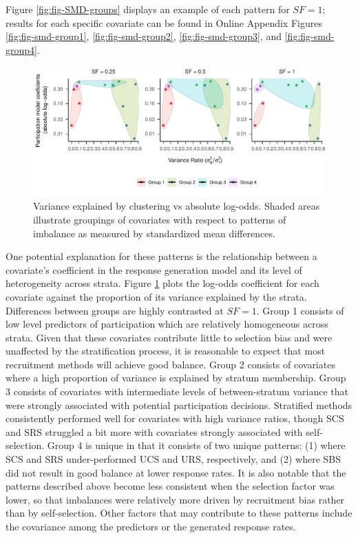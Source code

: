 \documentclass[
  man,floatsintext]{apa6}
\begin{document}
Figure \ref{fig:fig-SMD-groups} displays an example of each pattern for \(SF = 1\); results for each specific covariate can be found in Online Appendix Figures \ref{fig:fig-smd-group1}, \ref{fig:fig-smd-group2}, \ref{fig:fig-smd-group3}, and \ref{fig:fig-smd-group4}.



\begin{figure}
\centering
\includegraphics{6---Paper_files/figure-latex/fig-Var-Coef-1.pdf}
\caption{\label{fig:fig-Var-Coef}Variance explained by clustering vs absolute log-odds. Shaded areas illustrate groupings of covariates with respect to patterns of imbalance as measured by standardized mean differences.}
\end{figure}

One potential explanation for these patterns is the relationship between a covariate's coefficient in the response generation model and its level of heterogeneity across strata.
Figure \ref{fig:fig-Var-Coef} plots the log-odds coefficient for each covariate against the proportion of its variance explained by the strata.
Differences between groups are highly contrasted at \(SF = 1\). Group 1 consists of low level predictors of participation which are relatively homogeneous across strata. Given that these covariates contribute little to selection bias and were unaffected by the stratification process, it is reasonable to expect that most recruitment methods will achieve good balance.
Group 2 consists of covariates where a high proportion of variance is explained by stratum membership. Group 3 consists of covariates with intermediate levels of between-stratum variance that were strongly associated with potential participation decisions. Stratified methods consistently performed well for covariates with high variance ratios, though SCS and SRS struggled a bit more with covariates strongly associated with self-selection.
Group 4 is unique in that it consists of two unique patterns: (1) where SCS and SRS under-performed UCS and URS, respectively, and (2) where SBS did not result in good balance at lower response rates. It is also notable that the patterns described above become less consistent when the selection factor was lower, so that imbalances were relatively more driven by recruitment bias rather than by self-selection. Other factors that may contribute to these patterns include the covariance among the predictors or the generated response rates.
\end{document}
